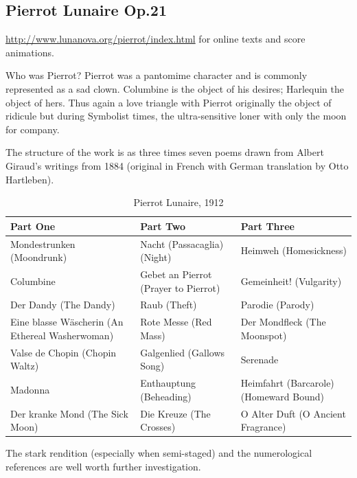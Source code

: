 \subsection{Pierrot Lunaire Op.21}

\url{http://www.lunanova.org/pierrot/index.html} for online texts and score animations. 

Who was Pierrot? Pierrot was a pantomime character and is commonly represented as a sad clown. Columbine is the object of his desires; Harlequin the object of hers. Thus again a love triangle with Pierrot originally the object of ridicule but during Symbolist times, the ultra-sensitive loner with only the moon for company.  

The structure of the work is as three times seven poems drawn from Albert Giraud's writings from 1884 (original in French with German translation by Otto Hartleben).  

\begin{table}[h!]
\begin{tabular}{|p{5.0cm}|p{5.0cm}|p{5.0cm}|} \hline
\textbf{Part One} & \textbf{Part Two} & \textbf{Part Three} \\\hline
Mondestrunken (Moondrunk) & Nacht (Passacaglia) (Night) & Heimweh (Homesickness)\\\hline
Columbine & Gebet an Pierrot (Prayer to Pierrot) & Gemeinheit! (Vulgarity)\\\hline
Der Dandy (The Dandy) & Raub (Theft)  & Parodie (Parody)\\\hline
Eine blasse W\"ascherin (An Ethereal Washerwoman) &  Rote Messe (Red Mass) & Der Mondfleck (The Moonspot)\\\hline
Valse de Chopin (Chopin Waltz) & Galgenlied (Gallows Song)  & Serenade\\\hline
Madonna & Enthauptung (Beheading) & Heimfahrt (Barcarole) (Homeward Bound)\\\hline
Der kranke Mond (The Sick Moon) & Die Kreuze (The Crosses) & O Alter Duft (O Ancient Fragrance)\\\hline
\end{tabular}
\caption{Pierrot Lunaire, 1912}
\label{tab:pierrot}
\end{table}

The stark rendition (especially when semi-staged) and the numerological references are well worth further investigation. 

\newpage




